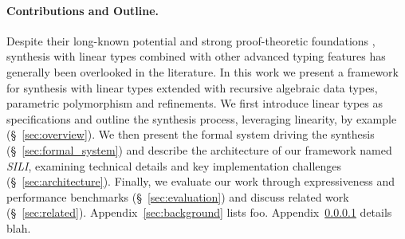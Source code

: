\documentclass{llncs}
\newcommand{\mypara}[1]{\paragraph{\textbf{#1}.}}
\newcommand{\synname}{\emph{SILI}}
\begin{document}
\mypara{Contributions and Outline} Despite their long-known potential
\cite{Wadler90lineartypes,DBLP:journals/mscs/CairesPT16,Bernardy_2018}
and strong proof-theoretic foundations
\cite{10.1093/logcom/2.3.297,DBLP:conf/cade/ChaudhuriP05,DBLP:journals/tcs/CervesatoHP00},
synthesis with linear types combined with other advanced typing
features has generally been overlooked in the literature.  In this
work we present a framework for synthesis with linear types extended
with recursive algebraic data types, parametric polymorphism and
refinements.
We first introduce linear types as specifications
and outline the synthesis process, leveraging linearity, by example
(\S~\ref{sec:overview}). We then present the formal system driving the
synthesis (\S~\ref{sec:formal_system}) and describe the architecture
of our framework named \synname, examining technical details and key
implementation challenges (\S~\ref{sec:architecture}). Finally, 
we evaluate our work through expressiveness and performance benchmarks
(\S~\ref{sec:evaluation}) and discuss related work
(\S~\ref{sec:related}). Appendix~\ref{sec:background} lists
foo. Appendix~\ref{} details blah.



\end{document}
